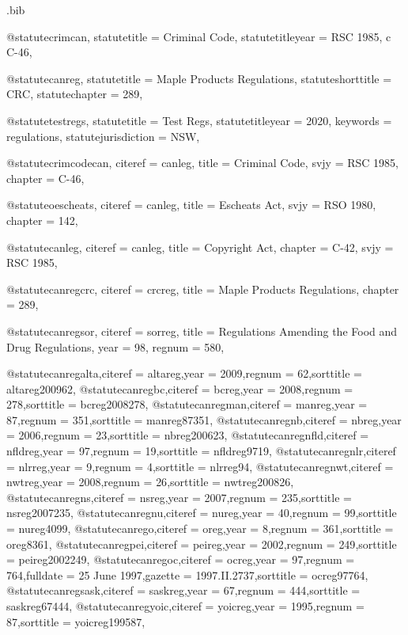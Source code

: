 \begin{filecontents*}[overwrite]{\jobname.bib}

@statute{crimcan,
statutetitle = {Criminal Code},
statutetitleyear = {RSC 1985, c C-46},%
}


@statute{canreg,
statutetitle = {Maple Products Regulations},
statuteshorttitle = {CRC},
statutechapter = {289},
}

@statute{testregs,
statutetitle = {Test Regs},
statutetitleyear = {2020},%
keywords = {regulations},
statutejurisdiction = {NSW},
}




@statute{crimcodecan,
citeref = {canleg},
title = {Criminal Code},
svjy = {RSC 1985},
chapter = {C-46},
}


@statute{oescheats,
citeref = {canleg},
title = {Escheats Act},
svjy = {RSO 1980},
chapter = {142},
}

@statute{canleg,
citeref = {canleg},
title = {Copyright Act},
chapter = {C-42},
svjy = {RSC 1985},
}

@statute{canregcrc,
citeref = {crcreg},
title = {Maple Products Regulations},
chapter = {289},
}


@statute{canregsor,
citeref = {sorreg},
title = {Regulations Amending the Food and Drug Regulations},
year = {98},
regnum = {580},
}

@statute{canregalta,citeref = {altareg},year = {2009},regnum = {62},sorttitle = {altareg200962},}
@statute{canregbc,citeref = {bcreg},year = {2008},regnum = {278},sorttitle = {bcreg2008278},}
@statute{canregman,citeref = {manreg},year = {87},regnum = {351},sorttitle = {manreg87351},}
@statute{canregnb,citeref = {nbreg},year = {2006},regnum = {23},sorttitle = {nbreg200623},}
@statute{canregnfld,citeref = {nfldreg},year = {97},regnum = {19},sorttitle = {nfldreg9719},}
@statute{canregnlr,citeref = {nlrreg},year = {9},regnum = {4},sorttitle = {nlrreg94},}
@statute{canregnwt,citeref = {nwtreg},year = {2008},regnum = {26},sorttitle = {nwtreg200826},}
@statute{canregns,citeref = {nsreg},year = {2007},regnum = {235},sorttitle = {nsreg2007235},}
@statute{canregnu,citeref = {nureg},year = {40},regnum = {99},sorttitle = {nureg4099},}
@statute{canrego,citeref = {oreg},year = {8},regnum = {361},sorttitle = {oreg8361},}
@statute{canregpei,citeref = {peireg},year = {2002},regnum = {249},sorttitle = {peireg2002249},}
@statute{canregoc,citeref = {ocreg},year = {97},regnum = {764},fulldate = {25 June 1997},gazette = { 1997.II.2737},sorttitle = {ocreg97764},}
@statute{canregsask,citeref = {saskreg},year = {67},regnum = {444},sorttitle = {saskreg67444},}
@statute{canregyoic,citeref = {yoicreg},year = {1995},regnum = {87},sorttitle = {yoicreg199587},}



\end{filecontents*}
